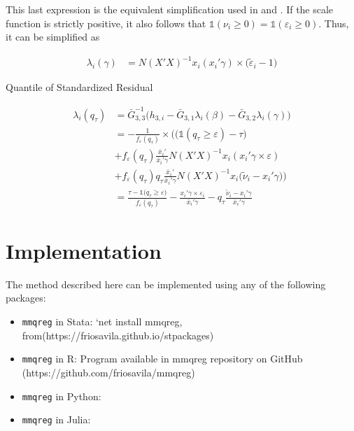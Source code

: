 \documentclass[
  authoryear,
  review,
  1p]{elsarticle}
\providecommand{\tightlist}{%
  \setlength{\itemsep}{0pt}\setlength{\parskip}{0pt}}\usepackage{longtable,booktabs,array}
\begin{document}
This last expression is the equivalent simplification used in
\citet{mss2019} and \citet{im2000}. If the scale function is strictly
positive, it also follows that
\(\mathbb{1}(\nu_i \geq 0)= \mathbb{1}(\varepsilon_i \geq 0)\). Thus, it
can be simplified as

\[\begin{aligned}
\lambda_i(\gamma) &= N(X'X)^{-1} x_i ( x_i' \gamma ) \times (\tilde \varepsilon_i -1\big)
\end{aligned}
\]

Quantile of Standardized Residual

\[\begin{aligned}
\lambda_i(q_\tau)&=\bar G_{3,3}^{-1}
\Big(
 h_{3,i}-\bar G_{3,1} \lambda_i(\beta)-\bar G_{3,2} \lambda_i(\gamma)
\Big) \\
&=-\frac{1}{f_{\varepsilon}(q_\tau)} \times \Bigg( \Big(\mathbb{1} ( q_\tau  \geq \varepsilon  ) - \tau \Big)  \\
&+ f_{\varepsilon} (q_\tau) \frac{\bar x_i'}{\bar x_i'\gamma} 
N (X'X)^{-1} x_i  ( x_i'\gamma \times \varepsilon) \\
&+ f_{\varepsilon}(q_\tau) q_\tau \frac{\bar x_i'}{\bar x_i'\gamma} N(X'X)^{-1} x_i   \big( \tilde \nu_i -x_i' 
  \gamma \big) 
\Bigg) \\
&=\frac{\tau-\mathbb{1}\big( q_\tau  \geq \varepsilon  \big) }{f_{\varepsilon}(q_\tau)}
- \frac{ x_i'\gamma \times \varepsilon_i }{\bar x_i'\gamma} 
-  q_\tau \frac{ \tilde \nu_i -x_i' 
  \gamma }{\bar x_i'\gamma} 
\end{aligned}
\]

\section{Implementation}\label{implementation}

The method described here can be implemented using any of the following
packages:

\begin{itemize}
\tightlist
\item
  \texttt{mmqreg} in Stata: `net install mmqreg,
  from(https://friosavila.github.io/stpackages)
\item
  \texttt{mmqreg} in R: Program available in mmqreg repository on GitHub
  (https://github.com/friosavila/mmqreg)
\item
  \texttt{mmqreg} in Python:
\item
  \texttt{mmqreg} in Julia:
\end{itemize}
\end{document}
